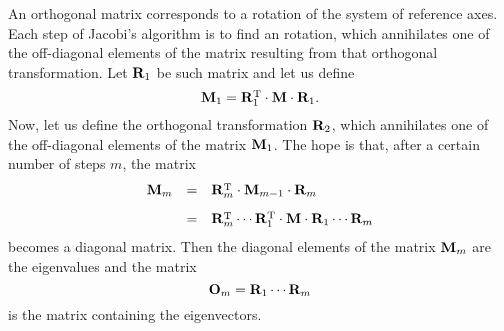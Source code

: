 \documentclass[twoside]{book}
\begin{document}
An orthogonal matrix corresponds to a rotation of the system of
reference axes. Each step of Jacobi's algorithm is to find an
rotation, which annihilates one of the off-diagonal elements of
the matrix resulting from that orthogonal transformation. Let
${\bf R}_1$ be such matrix and let us define
\begin{equation}
  {\bf M}_1 = {\bf R}^{\mathop{\rm T}}_1\cdot{\bf M}\cdot{\bf R}_1.
\end{equation}
Now, let us define the orthogonal transformation ${\bf R}_2$,
which annihilates one of the off-diagonal elements of the matrix
${\bf M}_1$. The hope is that, after a certain number of steps
$m$, the matrix
\begin{equation}
  \begin{array}{lcl}
    {\bf M}_m & = &{\bf R}^{\mathop{\rm T}}_m\cdot{\bf M}_{m-1}\cdot{\bf
    R}_m\\*[2ex]
      & = &{\bf R}^{\mathop{\rm T}}_m\cdots{\bf R}^{\mathop{\rm T}}_1\cdot{\bf M}\cdot{\bf
      R}_1\cdots{\bf R}_m
  \end{array}
\end{equation}
becomes a diagonal matrix. Then the diagonal elements of the
matrix ${\bf M}_m$ are the eigenvalues and the matrix
\begin{equation}
    {\bf O}_m = {\bf R}_1\cdots{\bf R}_m
\end{equation}
is the matrix containing the eigenvectors.
\end{document}
